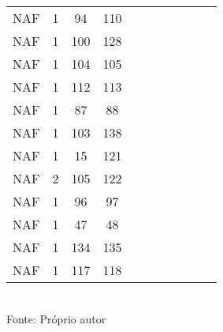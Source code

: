 \begin{table}[H]
{\begin{tabular}{ccccccccccc}
NAF & 1 & 94 & 110 &  &  &  &  &  &  &  \\
NAF & 1 & 100 & 128 &  &  &  &  &  &  &  \\
NAF & 1 & 104 & 105 &  &  &  &  &  &  &  \\
NAF & 1 & 112 & 113 &  &  &  &  &  &  &  \\
NAF & 1 & 87 & 88 &  &  &  &  &  &  &  \\
NAF & 1 & 103 & 138 &  &  &  &  &  &  &  \\
NAF & 1 & 15 & 121 &  &  &  &  &  &  &  \\
NAF & 2 & 105 & 122 &  &  &  &  &  &  &  \\
NAF & 1 & 96 & 97 &  &  &  &  &  &  &  \\
NAF & 1 & 47 & 48 &  &  &  &  &  &  &  \\
NAF & 1 & 134 & 135 &  &  &  &  &  &  &  \\
NAF & 1 & 117 & 118 &  &  &  &  &  &  &  \\
\bottomrule
\end{tabular}}
\\Fonte: Próprio autor
\end{table}



